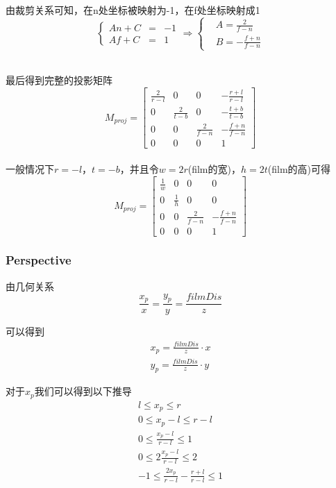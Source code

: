 由裁剪关系可知，在n处坐标被映射为-1，在f处坐标映射成1
\begin{displaymath}
\left\{
\begin{aligned}{}
An + C & = & -1\\
Af + C & = & 1
\end{aligned}
\right.
\Longrightarrow
\left\{
\begin{aligned}
&A = \frac{2}{f - n}\\
&B = -\frac{f + n}{f - n}
\end{aligned}
\right.
\end{displaymath}
\\
\par
最后得到完整的投影矩阵
\begin{displaymath}
M_{proj} = 
\begin{bmatrix}
\frac{2}{r - l} & 0 & 0 & -\frac{r + l}{r - l}\\
0 & \frac{2}{t - b} & 0 & -\frac{t + b}{t - b}\\
0 & 0 & \frac{2}{f - n} & -\frac{f + n}{f - n}\\
0 & 0 & 0 & 1
\end{bmatrix}
\end{displaymath}
\\
一般情况下$r = -l$，$t = -b$，并且令$w = 2r$(film的宽)，$h = 2t$(film的高)可得
\begin{displaymath}
M_{proj} = 
\begin{bmatrix}
\frac{1}{w} & 0 & 0 & 0\\
0 & \frac{1}{h} & 0 & 0\\
0 & 0 & \frac{2}{f - n} & -\frac{f + n}{f - n}\\
0 & 0 & 0 & 1
\end{bmatrix}
\end{displaymath}
\subsubsection{Perspective}
由几何关系
\begin{displaymath}
\frac{x_p}{x} = \frac{y_p}{y} = \frac{filmDis}{z}
\end{displaymath}

可以得到
\begin{gather*}
x_p = \frac{filmDis}{z} \cdot x\\
y_p = \frac{filmDis}{z} \cdot y
\end{gather*}

对于$x_p$我们可以得到以下推导
\begin{gather*}
l \leq x_p \leq r\\
0 \leq x_p - l \leq r-l\\
0 \leq \frac{x_p - l}{r - l} \leq 1\\
0 \leq 2\frac{x_p - l}{r - l} \leq 2\\
-1 \leq \frac{2 x_p}{r-l} - \frac{r + l}{r - l} \leq 1
\end{gather*}

